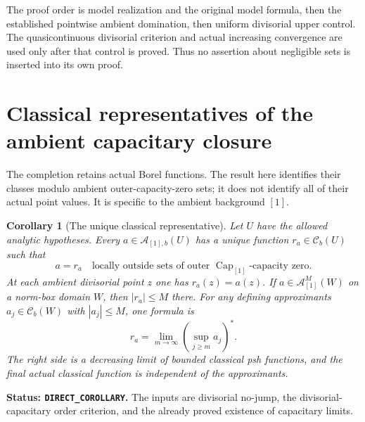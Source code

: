 \documentclass[11pt,a4paper]{article}
\numberwithin{equation}{section}
\newtheorem{corollary}[theorem]{Corollary}
\theoremstyle{definition}
\theoremstyle{remark}
\newcommand{\Cb}{\mathcal C_b}
\begin{document}
The proof order is model realization and the original model
formula, then the established pointwise ambient domination,
then uniform divisorial upper control. The quasicontinuous
divisorial criterion and actual increasing convergence are
used only after that control is proved. Thus no assertion
about negligible sets is inserted into its own proof.



\section{Classical representatives of the ambient capacitary closure}
\label{sec:r2-ambient-completion-representative}

The completion retains actual Borel functions. The result here
identifies their classes modulo ambient outer-capacity-zero sets;
it does not identify all of their actual point values. It is
specific to the ambient background $[1]$.

\begin{corollary}[The unique classical representative]
\label{cor:r2-ambient-classical-representative}
Let $U$ have the allowed analytic hypotheses. Every
$a\in\mathcal A_{[1],b}(U)$ has a unique function
$r_a\in\Cb(U)$ such that
\[
 a=r_a\quad\text{locally outside sets of outer }
          \operatorname{Cap}_{[1]}\text{-capacity zero}.
\]
At each ambient divisorial point $z$ one has $r_a(z)=a(z)$.
If $a\in\mathcal A^M_{[1]}(W)$ on a norm-box domain $W$,
then $|r_a|\leq M$ there. For any defining approximants
$a_j\in\Cb(W)$ with $|a_j|\leq M$, one formula is
\[
 r_a=\lim_{m\to\infty}
           \left(\sup_{j\geq m}a_j\right)^*.
\]
The right side is a decreasing limit of bounded classical psh
functions, and the final actual classical function is independent
of the approximants.
\end{corollary}

\noindent\textbf{Status: \texttt{DIRECT\_COROLLARY}.}
The inputs are divisorial no-jump, the divisorial-capacitary order
criterion, and the already proved existence of capacitary limits.
\end{document}
